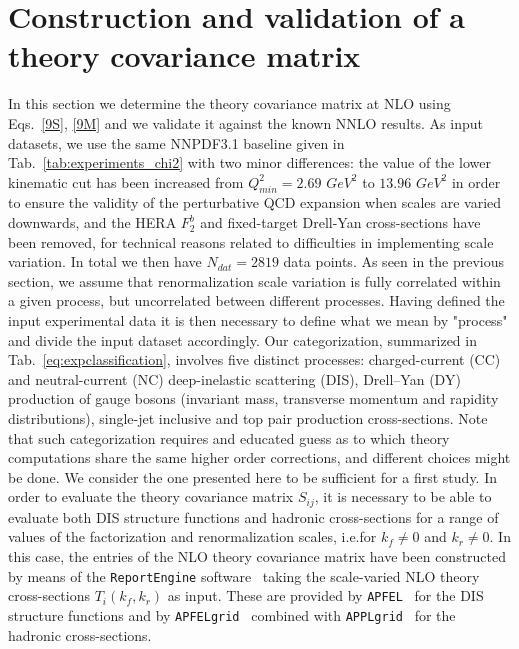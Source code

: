     \section{Construction and validation of a theory covariance matrix}
    \label{sec:validation}
    In this section we determine the theory covariance matrix at NLO using Eqs.~\ref{9S}, \ref{9M}
    and we validate it against the known NNLO results.
    As input datasets, we use the same NNPDF3.1 baseline given in Tab.~\ref{tab:experiments_chi2} with two minor differences:
    the value of the lower kinematic cut has been increased from $Q^2_{min} = 2.69 \,\,GeV^2$ to $13.96 \,\, GeV^2$
    in order to ensure the validity of the perturbative QCD expansion when scales are varied downwards, 
    and the HERA $F^b_2$ and fixed-target Drell-Yan cross-sections have been removed, 
    for technical reasons related to difficulties in implementing scale variation. 
    In total we then have $N_{dat} = 2819$ data points.
    As seen in the previous section, we assume that renormalization scale variation is fully correlated within 
    a given process, but uncorrelated between different processes.
    Having defined the input experimental data it is then necessary to define what we mean by "process" and
    divide the input dataset accordingly.
    Our categorization, summarized in Tab.~\ref{eq:expclassification}, involves five distinct processes:  charged-current (CC)
    and neutral-current (NC) deep-inelastic scattering (DIS),
    Drell–Yan (DY) production of gauge bosons (invariant mass,
    transverse momentum and rapidity distributions), single-jet
    inclusive and top pair production cross-sections.
    Note that such categorization requires and educated guess as to which theory computations share the same higher order
    corrections, and different choices might be done. 
    We consider the one presented here to be sufficient for a first study. 
    In order to evaluate the theory covariance matrix $S_{ij}$, it is necessary
    to be able to evaluate both DIS structure functions and hadronic
    cross-sections for a range of values of the factorization
    and renormalization scales, i.e.for $k_f \neq  0$ and $k_r \neq 0$.
    In this case, the entries of the NLO theory covariance matrix have been 
    constructed
    by means of the {\tt ReportEngine} software~\cite{zahari_kassabov_2019_2571601}
    taking the
    scale-varied NLO theory cross-sections $T_i(k_f,k_r)$  as input.
    These are provided 
    by {\tt APFEL}~\cite{Bertone:2013vaa} for the DIS structure functions
    and by {\tt APFELgrid}~\cite{Bertone:2016lga} combined with
    {\tt APPLgrid}~\cite{Carli:2010rw} for the hadronic
    cross-sections.

